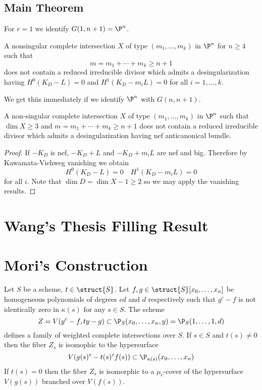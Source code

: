 \documentclass[12pt]{article}
\theoremstyle{plain}
\begin{document}
\subsection{Main Theorem}

For $r = 1$ we identify $G(1, n+1) = \P^n$. 

\begin{prop}
A nonsingular complete intersection $X$ of type $(m_1, \dots, m_k)$ in $\P^n$ for $n \ge 4$ such that
\[ m = m_1 + \cdots + m_k \ge n + 1 \]
does not contain a reduced irreducible divisor which admits a desingularization having $H^0(K_D - L) = 0$ and $H^1(K_D - m_i L) = 0$ for all $i = 1,\dots, k$. 
\end{prop}

We get thiis immediately if we identify $\P^n$ with $G(n, n+1)$. 

\begin{theorem}
A non-singular complete intersection $X$ of type $(m_1, \dots, m_k)$ in $\P^n$ such that $\dim{X} \ge 3$ and $m = m_1 + \cdots + m_k \ge n + 1$ does not contain a reduced irreducible divisor which admits a desingularization having nef anticanonical bundle.
\end{theorem}

\begin{proof}
If $-K_D$ is nef, $-K_D + L$ and $-K_D + m_i L$ are nef and big. Therefore by Kawamata-Viehweg vanishing we obtain
\[ H^0(K_D - L) = 0 \quad H^1(K_D - m_i L) = 0 \]
for all $i$. Note that $\dim{D} = \dim{X} - 1 \ge 2$ so we may apply the vanishing results. 
\end{proof}

\section{Wang's Thesis Filling Result}

\section{Mori's Construction}

Let $S$ be a scheme, $t \in \struct{S}$. Let $f, g \in \struct{S}[x_0, \dots, x_n]$ be homogeneous polynomials of degrees $cd$ and $d$ respectively such that $g^c - f$ is not identically zero in $\kappa(s)$ for any $s \in S$. The scheme
\[ Z = V(y^c - f, ty - g) \subset \P_S(x_0, \dots, x_n, y) = \P_S(1, \dots, 1, d) \]
defines a family of weighted complete intersections over $S$. If $s \in S$ and $t(s) \neq 0$ then the fiber $Z_s$ is isomophic to the hypersurface
\[ V(g(s)^c - t(s)^c f(s)) \subset \P_{\kappa(s)}(x_0, \dots, x_n) \]
If $t(s) = 0$ then the fiber $Z_s$ is isomorphic to a $\mu_c$-cover of the hypersurface $V(g(s))$ branched over $V(f(s))$. 
\end{document}
